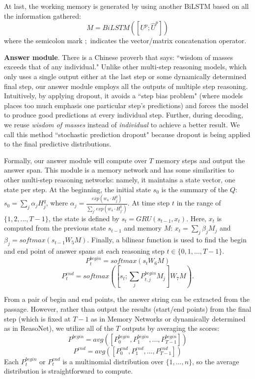 \documentclass[11pt,a4paper]{article}
\begin{document}
At last, the working memory is generated by using another BiLSTM based on all the information gathered:
\begin{equation}
M=BiLSTM([U^p; \hat{U}^p])
\label{eq:mem}
\end{equation}
where the semicolon mark $;$ indicates the vector/matrix concatenation operator.

\textbf{Answer module}.
There is a Chinese proverb that says: ``wisdom of masses exceeds that of any individual."
Unlike other multi-step reasoning models, which only uses a single output either at the last step or some dynamically determined final step, our answer module employs all the outputs of multiple step reasoning. Intuitively, by applying dropout, it avoids a ``step bias problem" (where models places too much emphasis one particular step's predictions) and forces the model to produce good predictions at every individual step. Further, during decoding, we reuse \textit{wisdom of masses} instead of \textit{individual} to achieve a better result.
We call this method ``stochastic prediction dropout" because dropout is being applied to the final predictive distributions. 

Formally, our answer module will compute over $T$ memory steps and output the answer span. 
This module is a memory network and has some similarities to other multi-step reasoning networks: namely, it maintains a state vector, one state per step. 
At the beginning, the initial state $s_0$ is the summary of the $Q$: $s_0=\sum_j \alpha_j H^q_{j}$, where $\alpha_j = \frac{exp(w_4 \cdot H^q_j)}{\sum_{j'}exp(w_4 \cdot H^q_{j'})}$. At time step $t$ in the range of $\{1, 2, ..., T-1\}$, the state is defined by $s_t = GRU(s_{t-1}, x_t)$. 
Here, $x_t$ is computed from the previous state $s_{t-1}$ and memory $M$: $x_t=\sum_j\beta_j M_j$ and $\beta_j = softmax(s_{t-1}W_5M)$. 
Finally, a bilinear function is used to find the begin and end point of answer spans at each reasoning step $t \in \{0,1,\ldots,T-1\}$. \vspace{-0.1cm}
\begin{equation}
P_t^{begin} = softmax(s_tW_6M)
\label{eq:begin}
\end{equation} 
\begin{equation}
P_t^{end} = softmax([s_t; \sum_j P_{t,j}^{begin}M_j]W_7M).
\label{eq:end}
\end{equation}


From a pair of begin and end points, the answer string can be extracted from the passage.
However, rather than output the results (start/end points) from the final step (which is fixed at $T-1$ as in Memory Networks or dynamically determined as in ReasoNet), 
we utilize all of the $T$ outputs by averaging the scores:
\begin{equation}
P^{begin} = avg([P_0^{begin}, P_1^{begin}, ..., P_{T-1}^{begin}])
\label{eq:avg}
\end{equation}
\begin{equation}
P^{end} = avg([P_0^{end}, P_1^{end}, ..., P_{T-1}^{end}])
\label{eq:avg2}
\end{equation} 
Each $P_t^{begin}$ or $P_t^{end}$ is a multinomial distribution over $\{1,\ldots,n\}$, so the average distribution is straightforward to compute. 
\end{document}
